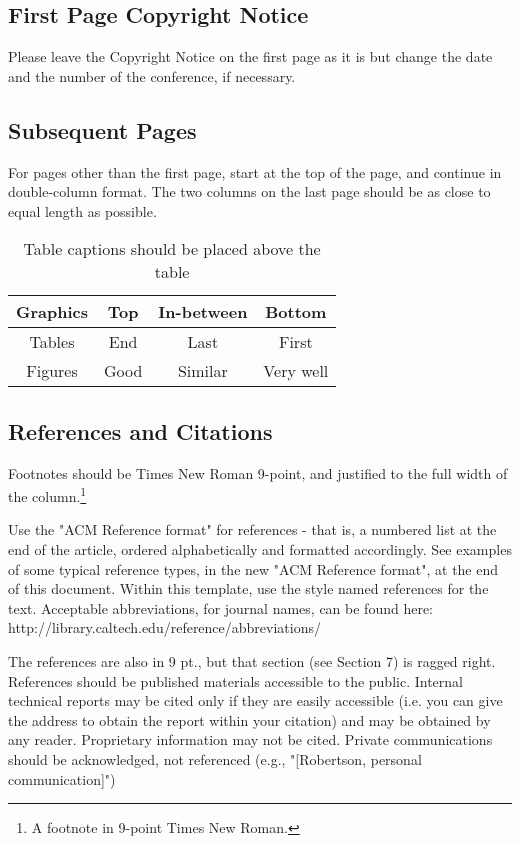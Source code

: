 \documentclass{sig-alternate-br}
\begin{document}
\subsection{First Page Copyright Notice}
Please leave the Copyright Notice on the first page as it is but
change the date and the number of the conference, if necessary.

\subsection{Subsequent Pages}
For pages other than the first page, start at the top of the page, and
continue in double-column format.  The two columns on the last page
should be as close to equal length as possible.

\begin{table}
\centering \caption{Table captions should be placed above the table}
\begin{tabular}{|c|c|c|c|} \hline
\textbf{Graphics} & \textbf{Top} & \textbf{In-between} & \textbf{Bottom}\\ \hline
Tables&End&Last&First\\ \hline
Figures&Good&Similar&Very well\\
\hline\end{tabular}
\end{table}

\subsection{References and Citations}
Footnotes should be Times New Roman 9-point, and justified to the
full width of the column.\footnote{A footnote in 9-point Times New Roman.}

Use the "ACM Reference format" for references - that is, a numbered
list at the end of the article, ordered alphabetically and formatted
accordingly. See examples of some typical reference types, in the new
"ACM Reference format", at the end of this document. Within this
template, use the style named references for the text. Acceptable
abbreviations, for journal names, can be found here:
http://library.caltech.edu/reference/abbreviations/

The references are also in 9 pt., but that section (see Section 7) is
ragged right. References should be published materials accessible to
the public. Internal technical reports may be cited only if they are
easily accessible (i.e. you can give the address to obtain the report
within your citation) and may be obtained by any reader. Proprietary
information may not be cited. Private communications should be
acknowledged, not referenced  (e.g., "[Robertson, personal communication]")
\end{document}
